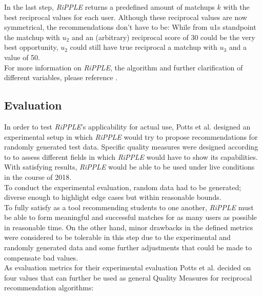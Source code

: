 \documentclass[conference]{IEEEtran}
\begin{document}
In the last step, \textit{RiPPLE} returns a predefined amount of matchups \(k\) with the best reciprocal values for each user. Although these reciprocal values are now symmetrical, the recommendations don't have to be: While from u1s standpoint the matchup with \(u_2\) and an (arbitrary) reciprocal score of 30 could be the very best opportunity, \(u_2\) could still have true reciprocal a matchup with \(u_3\) and a value of 50.\\
For more information on \textit{RiPPLE}, the algorithm and further clarification of different variables, please reference \cite{potts2018reciprocal}.\\	

\subsection{Evaluation}\label{paper:evaluation}
In order to test \textit{RiPPLE}'s applicability for actual use, Potts et al. designed an experimental setup in which \textit{RiPPLE} would try to propose recommendations for randomly generated test data. Specific quality measures were designed according to \cite{olakanmi2017group} to assess different fields in which \textit{RiPPLE} would have to show its capabilities. With satisfying results, \textit{RiPPLE} would be able to be used under live conditions in the course of 2018.\\
To conduct the experimental evaluation, random data had to be generated; diverse enough to highlight edge cases but within reasonable bounds.\\ 
To fully satisfy as a tool recommending students to one another, \textit{RiPPLE} must be able to form meaningful and successful matches for as many users as possible in reasonable time. On the other hand, minor drawbacks in the defined metrics were considered to be tolerable in this step due to the experimental and randomly generated data and some further adjustments that could be made to compensate bad values.\\
As evaluation metrics for their experimental evaluation Potts et al. decided on four values that can further be used as general Quality Measures for reciprocal recommendation algorithms:\\
\end{document}
